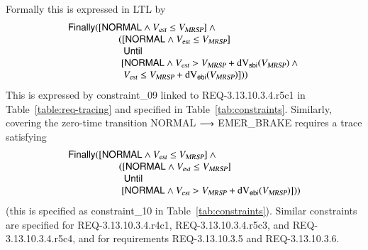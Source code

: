 Formally this is expressed in LTL by 
\[
\begin{array}{l}
 \mathsf{Finally} ([\mathsf{NORMAL}\wedge \vest \le \vmax]  \wedge {}
 \\\tabf
 ([\mathsf{NORMAL}\wedge \vest \le \vmax]
 \\\tabf \ \
 \mathsf{Until}
 \\\tabf\
 [\mathsf{NORMAL}\wedge \vest > \vmax+\dvs(\vmax) \wedge {}
 \\\tabf \  \
 \vest \le \vmax+\dve(\vmax)]))
\end{array}
\]
This is expressed by constraint\_09 linked to REQ-3.13.10.3.4.r5c1 in Table~\ref{table:req-tracing} and specified in Table~\ref{tab:constraints}.
Similarly, covering the zero-time transition {\sf NORMAL} $\longrightarrow$ {\sf EMER\_BRAKE} requires a trace satisfying
\[
\begin{array}{l}
 \mathsf{Finally} ([\mathsf{NORMAL}\wedge \vest \le \vmax]  \wedge {}
 \\\tabf
 ([\mathsf{NORMAL}\wedge \vest \le \vmax]
 \\\tabf \ \
 \mathsf{Until}
 \\\tabf\
 [\mathsf{NORMAL}\wedge \vest > \vmax+\dve(\vmax)]))
\end{array}
\]
(this is specified as constraint\_10 in Table~\ref{tab:constraints}).
Similar constraints are specified for REQ-3.13.10.3.4.r4c1, REQ-3.13.10.3.4.r5c3, and 
REQ-3.13.10.3.4.r5c4, and for requirements REQ-3.13.10.3.5 and REQ-3.13.10.3.6.

 




